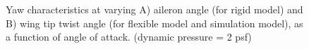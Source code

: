 \documentclass[11pt]{ucthesis}
\begin{document}
\begin{figure}
\hfill
{}
\hfill
{}
\hfill
\caption{Yaw characteristics at varying A) aileron angle (for rigid model) and B) wing tip twist angle (for flexible model and simulation model), as a function of angle of attack. (dynamic pressure = 2 psf)}
\label{fig:Q2Yaw}
\end{figure}
\end{document}
